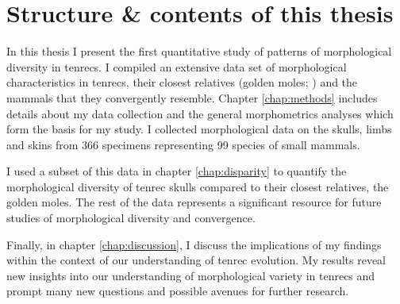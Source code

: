 \section{Structure \& contents of this thesis}
	
	In this thesis I present the first quantitative study of patterns of morphological diversity in tenrecs. I compiled an extensive data set of morphological characteristics in tenrecs, their closest relatives (golden moles; %
	) and the mammals that they convergently resemble. Chapter \ref{chap:methods} includes details about my data collection and the general morphometrics analyses which form the basis for my study. I collected morphological data on the skulls, limbs and skins from 366 specimens representing 99 species of small mammals. 
	
	I used a subset of this data in chapter \ref{chap:disparity} to quantify the morphological diversity of tenrec skulls compared to their closest relatives, the golden moles. The rest of the data represents a significant resource for future studies of morphological diversity and convergence.
	
	Finally, in chapter \ref{chap:discussion}, I discuss the implications of my findings within the context of our understanding of tenrec evolution.%
 	My results reveal new insights into our understanding of morphological variety in tenrecs and prompt many new questions and possible avenues for further research.


